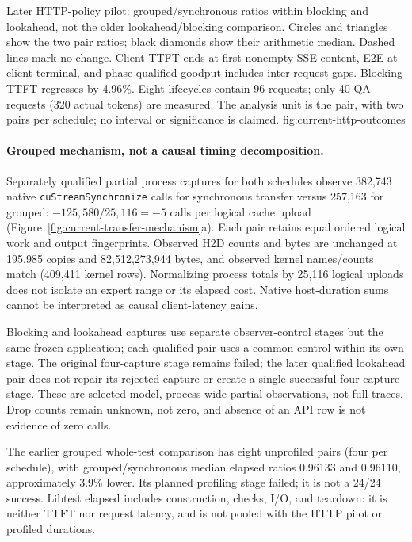 {Later HTTP-policy pilot: grouped/synchronous ratios within blocking and
lookahead, not the older lookahead/blocking comparison. Circles and triangles
show the two pair ratios; black diamonds show their arithmetic median.
Dashed lines mark no change. Client TTFT ends at first nonempty SSE content,
E2E at client terminal, and phase-qualified goodput includes inter-request
gaps. Blocking TTFT regresses by 4.96\%. Eight lifecycles contain 96 requests;
only 40 QA requests (320 actual tokens) are measured. The analysis unit is
the pair, with two pairs per schedule; no interval or significance is claimed.}
{fig:current-http-outcomes}

\paragraph{Grouped mechanism, not a causal timing decomposition.}
Separately qualified partial process captures for both schedules observe
382,743 native \texttt{cuStreamSynchronize} calls for synchronous transfer
versus 257,163 for grouped: $-125{,}580/25{,}116=-5$ calls per logical cache
upload (Figure~\ref{fig:current-transfer-mechanism}a). Each pair retains equal
ordered logical work and output fingerprints. Observed H2D counts and bytes
are unchanged at 195,985 copies and 82,512,273,944 bytes, and observed kernel
names/counts match (409,411 kernel rows). Normalizing process totals by
25,116 logical uploads does not isolate an expert range or its elapsed cost.
Native host-duration sums cannot be interpreted as causal client-latency gains.

Blocking and lookahead captures use separate observer-control stages but the
same frozen application; each qualified pair uses a common control within
its own stage. The original four-capture stage remains failed; the later
qualified lookahead pair does not repair its rejected capture or create a
single successful four-capture stage. These are selected-model,
process-wide partial observations, not full traces. Drop counts remain
unknown, not zero, and absence of an API row is not evidence of zero calls.

The earlier grouped whole-test comparison has eight unprofiled pairs (four
per schedule), with grouped/synchronous median elapsed ratios 0.96133 and
0.96110, approximately 3.9\% lower. Its planned profiling stage failed;
it is not a 24/24 success. Libtest elapsed includes construction, checks,
I/O, and teardown: it is neither TTFT nor request latency, and is not pooled
with the HTTP pilot or profiled durations.

